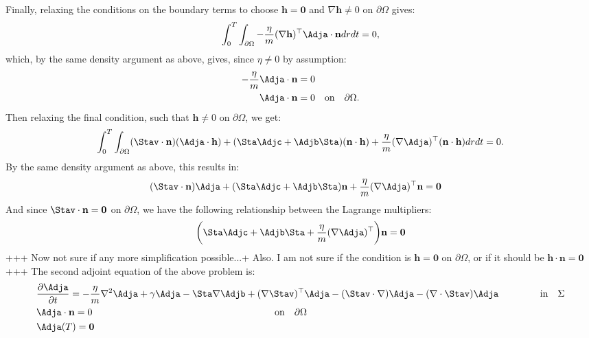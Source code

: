 Finally, relaxing the conditions on the boundary terms to choose $\mathbf{h}=\mathbf{0}$ and $\nabla \mathbf{h}  \neq 0$ on $\partial \Omega$ gives:
\begin{align*}
\int_0^T \int_{\partial \Omega} - \frac{\eta}{m} (\nabla \mathbf{h})^\top \Adja \cdot \mathbf{n} dr dt = 0,
\end{align*}
which, by the same density argument as above, gives, since $\eta \neq 0$ by assumption:
\begin{align}
\label{CondAdj1}
- \frac{\eta}{m}  \Adja  \cdot \mathbf{n}&= 0  \notag\\
 \Adja  \cdot \mathbf{n} &= 0 \quad \text{on} \quad \partial \Omega.
\end{align}
Then relaxing the final condition, such that $\mathbf{h} \neq 0$ on $\partial \Omega$, we get:
\begin{align*}
\int_0^T \int_{\partial\Omega} (\Stav \cdot \mathbf{n})(\Adja \cdot \mathbf{h}) +(\Sta  \Adjc + \Adjb \Sta)  (\mathbf{n}\cdot \mathbf{h}) +\frac{\eta}{m}  (\nabla \Adja)^\top ( \mathbf{n}\cdot \mathbf{h})dr dt=0.
\end{align*}
By the same density argument as above, this results in:
\begin{align*}
&(\Stav \cdot \mathbf{n})\Adja  +(\Sta  \Adjc + \Adjb \Sta)\mathbf{n}+\frac{\eta}{m}  (\nabla \Adja)^\top \mathbf{n} =\mathbf{0}
\end{align*}
And since $\Stav \cdot \mathbf{n} = \mathbf{0}$ on $\partial \Omega$, we have the following relationship between the Lagrange multipliers:
\begin{align*}
\bigg(\Sta  \Adjc + \Adjb \Sta+\frac{\eta}{m}  (\nabla \Adja)^\top \bigg) \mathbf{n} =\mathbf{0}
\end{align*}
+++ Now not sure if any more simplification possible...+ Also. I am not sure if the condition is $\mathbf{h} = \mathbf{0}$ on $\partial \Omega$, or if it should be $\mathbf{h} \cdot \mathbf{n}= \mathbf{0}$+++
The second adjoint equation of the above problem is:
\begin{align*}
&\frac{\partial \Adja}{\partial t} =  - \frac{\eta}{m} \nabla^2 \Adja  + \gamma\Adja-\Sta\nabla \Adjb +(\nabla \Stav)^\top\Adja 
- (\Stav \cdot \nabla)\Adja -  (\nabla \cdot \Stav)\Adja     \ \qquad\qquad \text{in} \quad \Sigma\\
&\Adja \cdot \mathbf{n} = 0 \qquad \qquad \qquad \qquad \qquad \qquad \qquad \qquad \qquad \quad \text{on} \quad \partial \Omega \\
&\Adja(T)=\mathbf{0}
\end{align*}
